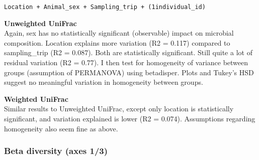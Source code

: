 \documentclass[
  letterpaper,
  DIV=11,
  numbers=noendperiod]{scrartcl}
\begin{document}
\texttt{Location\ +\ Animal\_sex\ +\ Sampling\_trip\ +\ (1\textbar{}individual\_id)}

\textbf{Unweighted UniFrac\\
}Again, sex has no statistically significant (observable) impact on
microbial composition. Location explains more variation (R2 = 0.117)
compared to sampling\_trip (R2 = 0.087). Both are statistically
significant. Still quite a lot of residual variation (R2 = 0.77). I then
test for homogeneity of variance between groups (assumption of
PERMANOVA) using betadisper. Plots and Tukey's HSD suggest no meaningful
variation in homogeneity between groups.

\textbf{Weighted UniFrac\\
}Similar results to Unweighted UniFrac, except only location is
statistically significant, and variation explained is lower (R2 =
0.074). Assumptions regarding homogeneity also seem fine as above.

\subsubsection{Beta diversity (axes 1/3)}\label{beta-diversity-axes-13}
\end{document}
